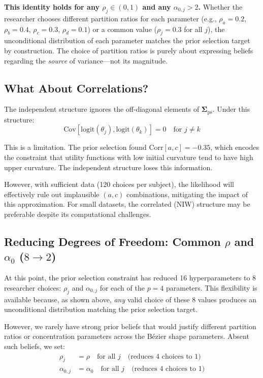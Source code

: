 \documentclass[11pt]{article}
\begin{document}
\textbf{This identity holds for any $\rho_j \in (0, 1)$ and any $\alpha_{0,j} > 2$.} Whether the researcher chooses different partition ratios for each parameter (e.g., $\rho_a = 0.2$, $\rho_b = 0.4$, $\rho_c = 0.3$, $\rho_d = 0.1$) or a common value ($\rho_j = 0.3$ for all $j$), the unconditional distribution of each parameter matches the prior selection target by construction. The choice of partition ratios is purely about expressing beliefs regarding the \textit{source} of variance---not its magnitude.

\subsection{What About Correlations?}

The independent structure ignores the off-diagonal elements of $\boldsymbol{\Sigma}_{\text{ps}}$. Under this structure:
\[
  \text{Cov}[\text{logit}(\theta_j), \text{logit}(\theta_k)] = 0 \quad \text{for } j \neq k
\]

This is a limitation. The prior selection found $\text{Corr}[a, c] = -0.35$, which encodes the constraint that utility functions with low initial curvature tend to have high upper curvature. The independent structure loses this information.

However, with sufficient data (120 choices per subject), the likelihood will effectively rule out implausible $(a, c)$ combinations, mitigating the impact of this approximation. For small datasets, the correlated (NIW) structure may be preferable despite its computational challenges.

\subsection{Reducing Degrees of Freedom: Common $\rho$ and $\alpha_0$ ($8 \to 2$)}

At this point, the prior selection constraint has reduced 16 hyperparameters to 8 researcher choices: $\rho_j$ and $\alpha_{0,j}$ for each of the $p = 4$ parameters. This flexibility is available because, as shown above, \textit{any} valid choice of these 8 values produces an unconditional distribution matching the prior selection target.

However, we rarely have strong prior beliefs that would justify different partition ratios or concentration parameters across the Bézier shape parameters. Absent such beliefs, we set:
\begin{align}
  \rho_j &= \rho \quad \text{for all } j \quad \text{(reduces 4 choices to 1)} \\
  \alpha_{0,j} &= \alpha_0 \quad \text{for all } j \quad \text{(reduces 4 choices to 1)}
\end{align}
\end{document}
